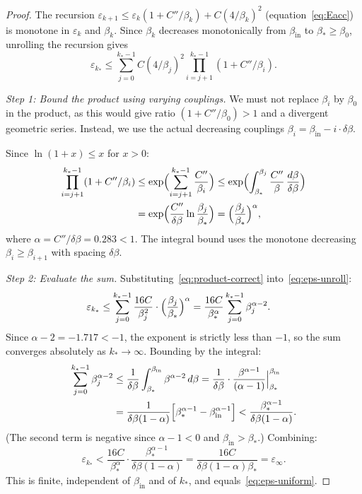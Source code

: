 \documentclass[11pt]{article}
\theoremstyle{definition}
\begin{document}
\begin{proof}
The recursion $\varepsilon_{k+1}\le\varepsilon_k(1+C''/\beta_k)
+C(4/\beta_k)^2$ (equation~\eqref{eq:Eacc}) is monotone
in $\varepsilon_k$ and $\beta_k$.  Since $\beta_k$ decreases
monotonically from $\beta_{\mathrm{in}}$ to $\beta_*\ge\beta_0$,
unrolling the recursion gives
\begin{equation}\label{eq:eps-unroll}
\varepsilon_{k_*}
\le\sum_{j=0}^{k_*-1}C(4/\beta_j)^2
\prod_{i=j+1}^{k_*-1}(1+C''/\beta_i).
\end{equation}

\emph{Step 1: Bound the product using varying couplings.}
We must not replace $\beta_i$ by $\beta_0$
in the product, as this would give ratio
$(1+C''/\beta_0)>1$ and a divergent geometric series.
Instead, we use the actual decreasing couplings
$\beta_i=\beta_{\mathrm{in}}-i\cdot\delta\beta$.

Since $\ln(1+x)\le x$ for $x>0$:
\begin{align}
\prod_{i=j+1}^{k_*-1}(1+C''/\beta_i)
&\le\exp\Bigl(\sum_{i=j+1}^{k_*-1}\frac{C''}{\beta_i}\Bigr)
\le\exp\Bigl(\int_{\beta_*}^{\beta_j}
\frac{C''}{\beta}\,\frac{d\beta}{\delta\beta}\Bigr)
\notag\\
&=\exp\Bigl(\frac{C''}{\delta\beta}
\ln\frac{\beta_j}{\beta_*}\Bigr)
=\Bigl(\frac{\beta_j}{\beta_*}\Bigr)^\alpha,
\label{eq:product-correct}
\end{align}
where $\alpha=C''/\delta\beta=0.283<1$.
The integral bound uses the monotone decreasing
$\beta_i\ge\beta_{i+1}$ with spacing $\delta\beta$.

\emph{Step 2: Evaluate the sum.}
Substituting~\eqref{eq:product-correct}
into~\eqref{eq:eps-unroll}:
\begin{align}
\varepsilon_{k_*}
&\le\sum_{j=0}^{k_*-1}\frac{16C}{\beta_j^2}
\cdot\Bigl(\frac{\beta_j}{\beta_*}\Bigr)^\alpha
=\frac{16C}{\beta_*^\alpha}
\sum_{j=0}^{k_*-1}\beta_j^{\alpha-2}.
\label{eq:eps-sum}
\end{align}
Since $\alpha-2=-1.717<-1$, the exponent is strictly
less than $-1$, so the sum converges absolutely
as $k_*\to\infty$.  Bounding by the integral:
\begin{align}
\sum_{j=0}^{k_*-1}\beta_j^{\alpha-2}
&\le\frac{1}{\delta\beta}\int_{\beta_*}^{\beta_{\mathrm{in}}}
\beta^{\alpha-2}\,d\beta
=\frac{1}{\delta\beta}\cdot
\frac{\beta^{\alpha-1}}{(\alpha-1)}
\Bigr|_{\beta_*}^{\beta_{\mathrm{in}}}
\notag\\
&=\frac{1}{\delta\beta(1-\alpha)}
\Bigl[\beta_*^{\alpha-1}
-\beta_{\mathrm{in}}^{\alpha-1}\Bigr]
<\frac{\beta_*^{\alpha-1}}{\delta\beta(1-\alpha)}.
\label{eq:sum-integral}
\end{align}
(The second term is negative since $\alpha-1<0$
and $\beta_{\mathrm{in}}>\beta_*$.)
Combining:
\begin{equation}\label{eq:eps-final}
\varepsilon_{k_*}
<\frac{16C}{\beta_*^\alpha}\cdot
\frac{\beta_*^{\alpha-1}}{\delta\beta(1-\alpha)}
=\frac{16C}{\delta\beta(1-\alpha)\beta_*}
=\varepsilon_\infty.
\end{equation}
This is finite, independent of $\beta_{\mathrm{in}}$
and of $k_*$, and equals~\eqref{eq:eps-uniform}.


\end{proof}
\end{document}
